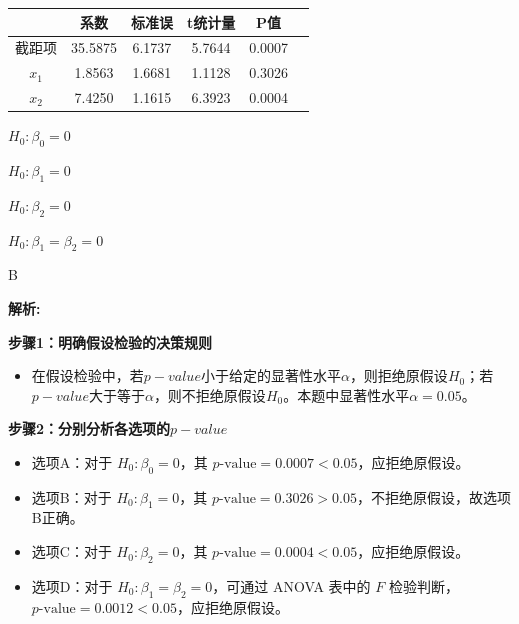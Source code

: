 \documentclass{article}
\newenvironment{explanation}
{\textbf{解析:}\par}
{\par}
\begin{document}
\begin{table}[h]
    \centering
    \begin{tabular}{@{}cccccc@{}}
        \toprule
        &系数 & 标准误 & t统计量 & P值 \\ \midrule
        截距项 & 35.5875 & 6.1737 & 5.7644 & 0.0007 \\
        \(x_1\) & 1.8563 & 1.6681 & 1.1128 & 0.3026 \\
        \(x_2\) & 7.4250 & 1.1615 & 6.3923 & 0.0004 \\ \bottomrule
    \end{tabular}
\end{table}
    \begin{choices}
        \item \(H_0: \beta_0 = 0\)
        \item \(H_0: \beta_1 = 0\)
        \item \(H_0: \beta_2 = 0\)
        \item \(H_0: \beta_1 = \beta_2 = 0\)
    \end{choices}
    
    \begin{correctanswer}
        B
    \end{correctanswer}
    
    \begin{explanation}
    \textbf{步骤1：明确假设检验的决策规则}
    \begin{itemize}
        \item 在假设检验中，若\(p - value\)小于给定的显著性水平\(\alpha\)，则拒绝原假设\(H_0\)；若\(p - value\)大于等于\(\alpha\)，则不拒绝原假设\(H_0\)。本题中显著性水平\(\alpha = 0.05\)。
    \end{itemize}
    \textbf{步骤2：分别分析各选项的\(p - value\)}
    \begin{itemize}
        \item 选项A：对于 \(H_0: \beta_0 = 0\)，其 \(p\text{-value} = 0.0007 < 0.05\)，应拒绝原假设。
        \item 选项B：对于 \(H_0: \beta_1 = 0\)，其 \(p\text{-value} = 0.3026 > 0.05\)，不拒绝原假设，故选项B正确。
        \item 选项C：对于 \(H_0: \beta_2 = 0\)，其 \(p\text{-value} = 0.0004 < 0.05\)，应拒绝原假设。
        \item 选项D：对于 \(H_0: \beta_1 = \beta_2 = 0\)，可通过 ANOVA 表中的 \(F\) 检验判断，\(p\text{-value} = 0.0012 < 0.05\)，应拒绝原假设。
    \end{itemize}
    \end{explanation}
    
\end{document}
